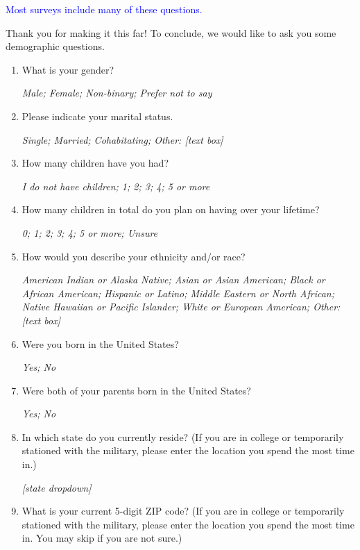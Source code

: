 \documentclass[11pt, headsepline]{article}
\newcommand{\blue}[1]{\textcolor{blue}{#1}}
\begin{document}
\blue{Most surveys include many of these questions.}

Thank you for making it this far! To conclude, we would like to ask you some demographic questions.

\begin{enumerate}[resume]

    \item What is your gender?

    \textit{Male; Female; Non-binary; Prefer not to say}

    \item Please indicate your marital status.

    \textit{Single; Married; Cohabitating; Other: [text box]}

    \item How many children have you had?

    \textit{I do not have children; 1; 2; 3; 4; 5 or more}

    \item How many children in total do you plan on having over your lifetime?

    \textit{0; 1; 2; 3; 4; 5 or more; Unsure}

    \item How would you describe your ethnicity and/or race?

    \textit{American Indian or Alaska Native; Asian or Asian American; Black or African American; Hispanic or Latino; Middle Eastern or North African; Native Hawaiian or Pacific Islander; 
    White or European American; Other: [text box]}

    \item Were you born in the United States?

    \textit{Yes; No}

    \item Were both of your parents born in the United States?

    \textit{Yes; No}

    \item In which state do you currently reside? (If you are in college or temporarily stationed with the military, please enter the location you spend the most time in.)

    \textit{[state dropdown]}

    \item What is your current 5-digit ZIP code? (If you are in college or temporarily stationed with the military, please enter the location you spend the most time in. You may skip if you are not sure.)


\end{enumerate}
\end{document}
